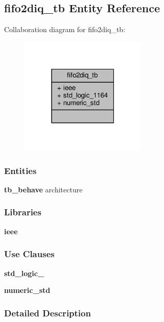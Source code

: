\subsection{fifo2diq\+\_\+tb Entity Reference}
\label{classfifo2diq__tb}


Collaboration diagram for fifo2diq\+\_\+tb\+:\nopagebreak
\begin{figure}[H]
\begin{center}
\leavevmode
\includegraphics[width=171pt]{df/d86/classfifo2diq__tb__coll__graph}
\end{center}
\end{figure}
\subsubsection*{Entities}
\begin{DoxyCompactItemize}
\item 
{\bf tb\+\_\+behave} architecture
\end{DoxyCompactItemize}
\subsubsection*{Libraries}
 \begin{DoxyCompactItemize}
\item 
{\bf ieee} 
\end{DoxyCompactItemize}
\subsubsection*{Use Clauses}
 \begin{DoxyCompactItemize}
\item 
{\bf std\+\_\+logic\+\_}   
\item 
{\bf numeric\+\_\+std}   
\end{DoxyCompactItemize}


\subsubsection{Detailed Description}


